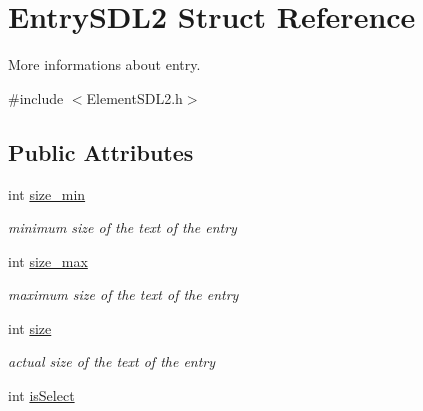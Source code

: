 \hypertarget{structEntrySDL2}{}\section{Entry\+S\+D\+L2 Struct Reference}
\label{structEntrySDL2}


More informations about entry.  




{\ttfamily \#include $<$Element\+S\+D\+L2.\+h$>$}

\subsection*{Public Attributes}
\begin{DoxyCompactItemize}
\item 
int \hyperlink{structEntrySDL2_a6713933ba31b9a8f3436dbc93f205340}{size\+\_\+min}\hypertarget{structEntrySDL2_a6713933ba31b9a8f3436dbc93f205340}{}\label{structEntrySDL2_a6713933ba31b9a8f3436dbc93f205340}

\begin{DoxyCompactList}\small\item\em minimum size of the text of the entry \end{DoxyCompactList}\item 
int \hyperlink{structEntrySDL2_a527d25625060a6f0770873b1c3039f73}{size\+\_\+max}\hypertarget{structEntrySDL2_a527d25625060a6f0770873b1c3039f73}{}\label{structEntrySDL2_a527d25625060a6f0770873b1c3039f73}

\begin{DoxyCompactList}\small\item\em maximum size of the text of the entry \end{DoxyCompactList}\item 
int \hyperlink{structEntrySDL2_adad4bfa55d814798c0198b3dc1b17514}{size}\hypertarget{structEntrySDL2_adad4bfa55d814798c0198b3dc1b17514}{}\label{structEntrySDL2_adad4bfa55d814798c0198b3dc1b17514}

\begin{DoxyCompactList}\small\item\em actual size of the text of the entry \end{DoxyCompactList}\item 
int \hyperlink{structEntrySDL2_a92de743f9f3ea22c88f132f05793ba0b}{is\+Select}\hypertarget{structEntrySDL2_a92de743f9f3ea22c88f132f05793ba0b}{}\label{structEntrySDL2_a92de743f9f3ea22c88f132f05793ba0b}


\end{DoxyCompactItemize}
